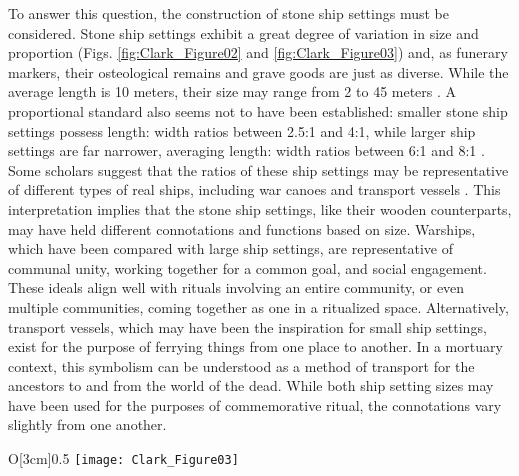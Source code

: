 To answer this question, the construction of stone ship settings must be considered. Stone ship settings exhibit a great degree of variation in size and proportion (Figs. \ref{fig:Clark_Figure02} and \ref{fig:Clark_Figure03}) and, as funerary markers, their osteological remains and grave goods are just as diverse.
While the average length is 10 meters, their size may range from 2 to 45 meters \parencite[222]{Price_2015}.
A proportional standard also seems not to have been established: smaller stone ship settings possess length: width ratios between 2.5:1 and 4:1, while larger ship settings are far narrower, averaging length: width ratios between 6:1 and 8:1 \parencite[95]{Bradley_2010}.
Some scholars suggest that the ratios of these ship settings may be representative of different types of real ships, including war canoes and transport vessels \parencites{Artursson_2013}{Bradley_2010}[204-205]{Skoglund_2014}. This interpretation implies that the stone ship settings, like their wooden counterparts, may have held different connotations and functions based on size. Warships, which have been compared with large ship settings, are representative of communal unity, working together for a common goal, and social engagement. These ideals align well with rituals involving an entire community, or even multiple communities, coming together as one in a ritualized space. Alternatively, transport vessels, which may have been the inspiration for small ship settings, exist for the purpose of ferrying things from one place to another. In a mortuary context, this symbolism can be understood as a method of transport for the ancestors to and from the world of the dead. While both ship setting sizes may have been used for the purposes of commemorative ritual, the connotations vary slightly from one another.



\begin{wrapfigure}{O}[3cm]{0.5\textwidth}
	\texttt{[image: Clark\_Figure03]}
	\caption{Two Viking stone ships (burial grounds) at Badekunda, near Västerås, Sweden. 2005.
		{\normalfont\scriptsize \\ \copyright\ Berig, Wikimedia Commons License.
	}}
	\label{fig:Clark_Figure03}
\end{wrapfigure}


